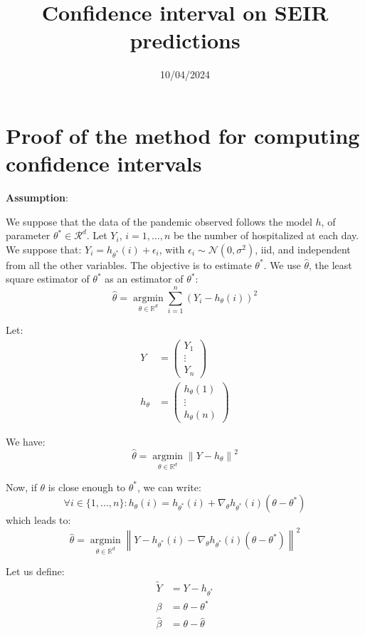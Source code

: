 \documentclass{article}
\title{Confidence interval on SEIR predictions}
\author{}
\date{10/04/2024}
\begin{document}
\maketitle

\section{Proof of the method for computing confidence intervals}

\textbf{Assumption}:

We suppose that the data of the pandemic observed follows the model $h$, of parameter $\theta^* \in \mathcal{R}^d$. Let $Y_i$, $ i = 1, \ldots, n$ be the number of hospitalized at each day. We suppose that: $Y_i = h_{\theta ^* } (i) + \epsilon_i$, with $\epsilon_i \sim \mathcal{N}(0, \sigma^2)$, iid, and independent from all the other variables. The objective is to estimate $\theta^*$. We use $\hat{\theta}$, the least square estimator of $\theta^*$ as an estimator of $\theta^* $:
\[
\hat{\theta} =  \underset{\theta \in \mathbb{R}^d}{\operatorname{argmin}} \sum_{i=1}^{n} (Y_i - h_{\theta}(i))^2
\]

Let:
\begin{align*}
Y &= \begin{pmatrix}
Y_1 \\
\vdots \\
Y_n
\end{pmatrix} \\
h_\theta &= \begin{pmatrix}
h_\theta(1) \\
\vdots \\
h_\theta(n)
\end{pmatrix}
\end{align*}

We have:
\[
\hat{\theta} =  \underset{\theta \in \mathbb{R}^d}{\operatorname{argmin}}  \left\lVert Y - h_\theta \right\rVert ^2
\]

Now, if $\theta$ is close enough to $\theta^*$, we can write:
\[
\forall i \in \{ 1, ..., n\} :  h_\theta(i) = h_{\theta^*} (i ) + \nabla_\theta h_{\theta^*}(i) (\theta - \theta^*)
\]
which leads to:
\[
\hat{\theta} =  \underset{\theta \in \mathbb{R}^d}{\operatorname{argmin}}  \left\lVert Y - h_{\theta^*} (i ) - \nabla_\theta h_{\theta^*}(i) (\theta - \theta^*) \right\rVert ^2
\]

Let us define:
\begin{align*}
\tilde{Y} &= Y - h_{\theta^*} \\
\beta &= \theta - \theta^* \\
\hat{\beta} &= \theta - \hat{\theta}
\end{align*}
\end{document}
